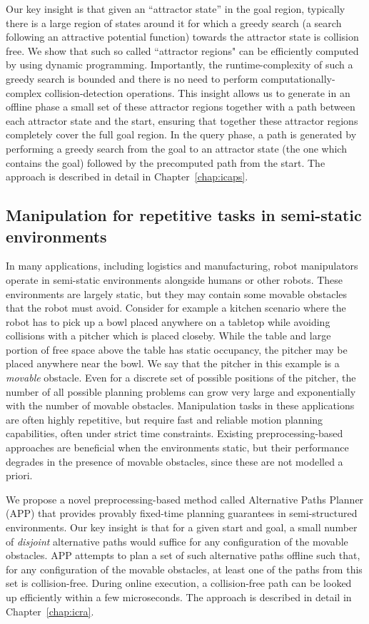 \documentclass[a4paper]{report}
\begin{document}
Our key insight is that given an ``attractor state'' in the goal region, typically there is a large region of states around it for which a greedy search (a search following an attractive potential function) towards the attractor state is collision free. We show that such so called ``attractor regions" can be efficiently computed by using dynamic programming.
Importantly, the runtime-complexity of such a greedy search is bounded and there is no need to perform computationally-complex collision-detection operations. 
This insight allows us to generate in an offline phase a small set of these attractor regions together with a path between each attractor state and the start, ensuring that together these attractor regions completely cover the full goal region.
In the query phase, a path is generated by performing a greedy search from the goal to an attractor state (the one which contains the goal) followed by the precomputed path from the start. The approach is described in detail in Chapter~\ref{chap:icaps}.


\subsection{Manipulation for repetitive tasks in semi-static environments}
In many applications, including logistics and manufacturing, robot manipulators operate in semi-static environments alongside humans or other robots. These environments are largely static, but they may contain some movable obstacles that the robot must avoid.
Consider for example a kitchen scenario where the robot has to pick up a bowl placed anywhere on a tabletop while avoiding collisions with a pitcher which is placed closeby. While the table and large portion of free space above the table has static occupancy, the pitcher may be placed anywhere near the bowl. We say that the pitcher in this example is a \emph{movable} obstacle. Even for a discrete set of possible positions of the pitcher, the number of all possible planning problems can grow very large and exponentially with the number of movable obstacles.
Manipulation tasks in these applications are often highly repetitive, but require fast and reliable motion planning capabilities, often under strict time constraints. Existing preprocessing-based approaches are beneficial when the environments static, but their performance degrades in the presence of movable obstacles, since these are not modelled a priori.

We propose a novel preprocessing-based method called Alternative Paths Planner (APP) that provides provably fixed-time planning guarantees in semi-structured environments. Our key insight is that for a given start and goal, a small number of \emph{disjoint} alternative paths would suffice for any configuration of the movable obstacles. APP attempts to plan a set of such alternative paths offline such that, for any configuration of the movable obstacles, at least one of the paths from this set is collision-free. During online execution, a collision-free path can be looked up efficiently within a few microseconds. The approach is described in detail in Chapter~\ref{chap:icra}.
\end{document}
